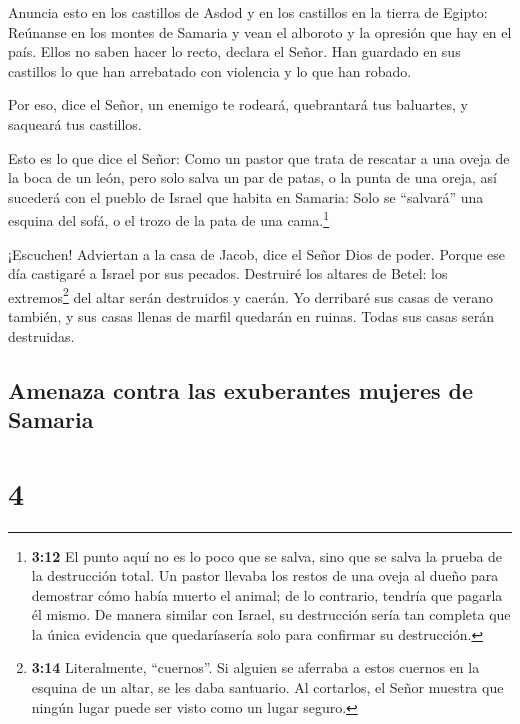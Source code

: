  Anuncia esto en los castillos de Asdod y en los castillos
en la tierra de Egipto: Reúnanse en los montes de Samaria y vean el
alboroto y la opresión que hay en el país.  Ellos no
saben hacer lo recto, declara el Señor. Han guardado en sus castillos lo
que han arrebatado con violencia y lo que han robado.

 Por eso, dice el Señor, un enemigo te rodeará,
quebrantará tus baluartes, y saqueará tus castillos.

 Esto es lo que dice el Señor: Como un pastor que trata
de rescatar a una oveja de la boca de un león, pero solo salva un par de
patas, o la punta de una oreja, así sucederá con el pueblo de Israel que
habita en Samaria: Solo se ``salvará'' una esquina del sofá, o el trozo
de la pata de una cama.\footnote{\textbf{3:12} El punto aquí no es lo
  poco que se salva, sino que se salva la prueba de la destrucción
  total. Un pastor llevaba los restos de una oveja al dueño para
  demostrar cómo había muerto el animal; de lo contrario, tendría que
  pagarla él mismo. De manera similar con Israel, su destrucción sería
  tan completa que la única evidencia que quedaríasería solo para
  confirmar su destrucción.}

 ¡Escuchen! Adviertan a la casa de Jacob, dice el Señor
Dios de poder.  Porque ese día castigaré a Israel por sus
pecados. Destruiré los altares de Betel: los extremos\footnote{\textbf{3:14}
  Literalmente, ``cuernos''. Si alguien se aferraba a estos cuernos en
  la esquina de un altar, se les daba santuario. Al cortarlos, el Señor
  muestra que ningún lugar puede ser visto como un lugar seguro.} del
altar serán destruidos y caerán.  Yo derribaré sus casas
de verano también, y sus casas llenas de marfil quedarán en ruinas.
Todas sus casas serán destruidas.

\hypertarget{amenaza-contra-las-exuberantes-mujeres-de-samaria}{%
\subsection{Amenaza contra las exuberantes mujeres de
Samaria}\label{amenaza-contra-las-exuberantes-mujeres-de-samaria}}

\hypertarget{section-3}{%
\section{4}\label{section-3}}

